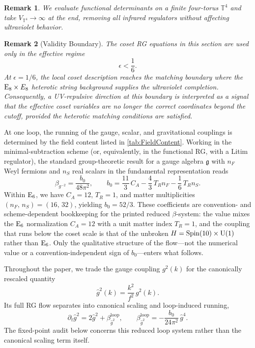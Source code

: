 \documentclass[pdflatex,sn-mathphys-num]{sn-jnl}
\theoremstyle{thmstyleone}
\theoremstyle{thmstylethree}%
\theoremstyle{thmstyletwo}%
\newtheorem{remark}[remark]{Remark}
\begin{document}
\begin{remark}
We evaluate functional determinants on a finite four-torus
$\mathbb T^{4}$ and take $V_{\mathbb T^{4}}\to\infty$ at the end,
removing all infrared regulators without affecting ultraviolet
behavior.
\end{remark}

\begin{remark}[Validity Boundary]\label{rmk:EpsilonCutoff}
The coset RG equations in this section are used only in the effective regime
\[
  \epsilon<\frac16 .
\]
At \(\epsilon=1/6\), the local coset description reaches the matching boundary
where the $\mathrm{E}_{8}\times E_{8}$ heterotic string background supplies the
ultraviolet completion. Consequently, a UV-repulsive direction at this boundary
is interpreted as a signal that the effective coset variables are no longer the
correct coordinates beyond the cutoff, provided the heterotic matching
conditions are satisfied.
\end{remark}

At one loop, the running of the gauge, scalar, and gravitational
couplings is determined by the field content listed in
\autoref{tab:FieldContent}.  Working in the minimal-subtraction scheme
(or, equivalently, in the functional RG, with a Litim regulator), the
standard group-theoretic result for a gauge algebra $\mathfrak g$ with
$n_{F}$ Weyl fermions and $n_{S}$ real scalars in the fundamental
representation reads \cite{MachacekVaughn:1984}  
\[
  \beta_{g^{-2}}
  =
  \frac{b_0}{48\pi^2},\qquad b_0 = \frac{11}{3}\,C_{A}
  -\frac{4}{3}\,T_{R}n_{F}
  -\frac16\,T_{R}n_{S}.
\]
Within $\mathrm{E}_{6}$, we have $C_A = 12$, $T_R = 1$, and matter multiplicities
$(n_{F},\,n_{S})=(16,\,32)$, yielding $b_0 = 52/3$. These coefficients are
convention- and scheme-dependent bookkeeping for the printed reduced
$\beta$-system: the value mixes the $\mathrm{E}_{6}$ normalization $C_A=12$ with a unit
matter index $T_R=1$, and the coupling that runs below the coset scale is that
of the unbroken $H=\operatorname{Spin}(10) \times \mathrm{U(1)}$ rather than $\mathrm{E}_{6}$. Only the qualitative
structure of the flow---not the numerical value or a convention-independent
sign of $b_0$---enters what follows.

Throughout the paper, we trade the gauge coupling
$g^{2}(k)$ for the canonically rescaled quantity
\[
  \hat g^{2}(k)=\frac{k^{2}}{f^{2}}\,g^{2}(k).
\]
Its full RG flow separates into canonical scaling and loop-induced running,
\[
  \partial_t\hat g^{2}
  =
  2\hat g^{2}
  +\beta_{\hat g^{2}}^{\mathrm{loop}},
  \qquad
  \beta_{\hat g^{2}}^{\mathrm{loop}}
  =
  -\frac{b_0}{24\pi^{2}}\,\hat g^{4}.
\]
The fixed-point audit below concerns this reduced loop system rather than the
canonical scaling term itself.
\end{document}
